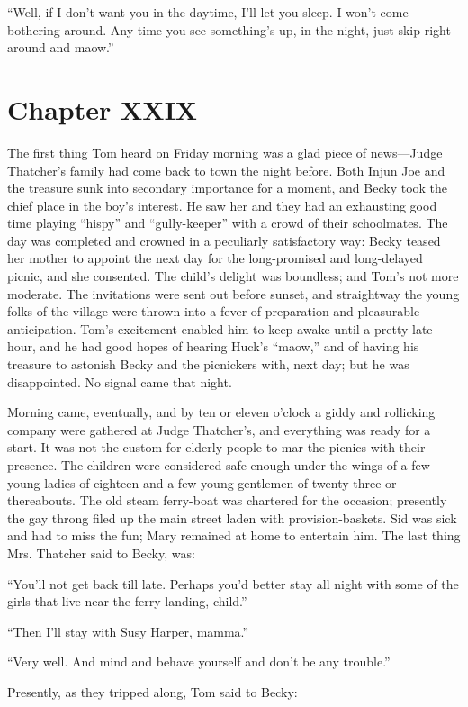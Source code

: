 \documentclass{book}
\begin{document}
“Well, if I don’t want you in the daytime, I’ll let you sleep. I won’t come bothering around. Any time you see something’s up, in the night, just skip right around and maow.”

\chapter*{Chapter XXIX}

The first thing Tom heard on Friday morning was a glad piece of news—Judge Thatcher’s family had come back to town the night before. Both Injun Joe and the treasure sunk into secondary importance for a moment, and Becky took the chief place in the boy’s interest. He saw her and they had an exhausting good time playing “hispy” and “gully-keeper” with a crowd of their schoolmates. The day was completed and crowned in a peculiarly satisfactory way: Becky teased her mother to appoint the next day for the long-promised and long-delayed picnic, and she consented. The child’s delight was boundless; and Tom’s not more moderate. The invitations were sent out before sunset, and straightway the young folks of the village were thrown into a fever of preparation and pleasurable anticipation. Tom’s excitement enabled him to keep awake until a pretty late hour, and he had good hopes of hearing Huck’s “maow,” and of having his treasure to astonish Becky and the picnickers with, next day; but he was disappointed. No signal came that night.

Morning came, eventually, and by ten or eleven o’clock a giddy and rollicking company were gathered at Judge Thatcher’s, and everything was ready for a start. It was not the custom for elderly people to mar the picnics with their presence. The children were considered safe enough under the wings of a few young ladies of eighteen and a few young gentlemen of twenty-three or thereabouts. The old steam ferry-boat was chartered for the occasion; presently the gay throng filed up the main street laden with provision-baskets. Sid was sick and had to miss the fun; Mary remained at home to entertain him. The last thing Mrs. Thatcher said to Becky, was:

“You’ll not get back till late. Perhaps you’d better stay all night with some of the girls that live near the ferry-landing, child.”

“Then I’ll stay with Susy Harper, mamma.”

“Very well. And mind and behave yourself and don’t be any trouble.”

Presently, as they tripped along, Tom said to Becky:
\end{document}
